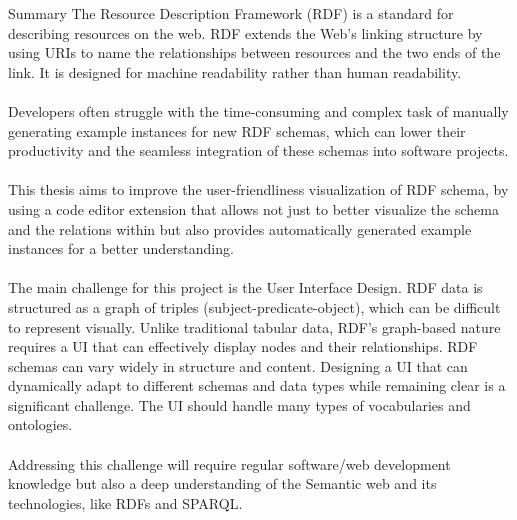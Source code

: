 \vspace*{0pt plus 1fill}
\begin{tucsimplesection}{Summary}
    The Resource Description Framework (RDF) is a standard for describing resources on the web.
    RDF extends the Web’s linking structure by using URIs to name the relationships between
    resources and the two ends of the link. It is designed for machine readability rather than human
    readability.
    \\
    \\
    Developers often struggle with the time-consuming and complex task of manually generating
    example instances for new RDF schemas, which can lower their productivity and the seamless
    integration of these schemas into software projects.
    \\
    \\
    This thesis aims to improve the user-friendliness visualization of RDF schema, by using a code
    editor extension that allows not just to better visualize the schema and the relations within but
    also provides automatically generated example instances for a better understanding.
    \\
    \\
    The main challenge for this project is the User Interface Design. RDF data is structured as a
    graph of triples (subject-predicate-object), which can be difficult to represent visually. Unlike
    traditional tabular data, RDF’s graph-based nature requires a UI that can effectively display
    nodes and their relationships. RDF schemas can vary widely in structure and content. Designing
    a UI that can dynamically adapt to different schemas and data types while remaining clear is a
    significant challenge. The UI should handle many types of vocabularies and ontologies.
    \\
    \\
    Addressing this challenge will require regular software/web development knowledge but also a
    deep understanding of the Semantic web and its technologies, like RDFs and SPARQL.
\end{tucsimplesection}
\vspace*{0pt plus 2.5fill}

